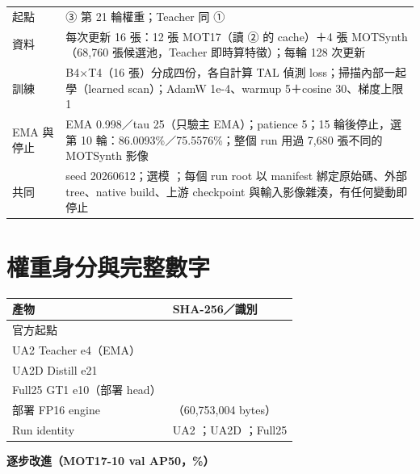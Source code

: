 \documentclass[UTF8,11pt,a4paper,fontset=none]{ctexart}
\newcommand{\code}[1]{\texttt{\detokenize{#1}}}
\begin{document}
\begin{longtable}{@{}P{2.6cm} P{12.2cm}@{}}
起點 & ③ 第 21 輪權重；Teacher 同 ① \\
資料 & 每次更新 16 張：12 張 MOT17（讀 ② 的 cache）＋4 張 MOTSynth（68,760 張候選池，Teacher 即時算特徵）；每輪 128 次更新 \\
訓練 & B4×T4（16 張）分成四份，各自計算 TAL 偵測 loss；掃描內部一起學（learned scan）；AdamW 1e-4、warmup 5＋cosine 30、梯度上限 1 \\
EMA 與停止 & EMA 0.998／tau 25（只驗主 EMA）；patience 5；15 輪後停止，選第 10 輪：86.0093\%／75.5576\%；整個 run 用過 7,680 張不同的 MOTSynth 影像 \\
\midrule
共同 & seed 20260612；選模 \code{t01-selection/1}；每個 run root 以 manifest 綁定原始碼、外部 tree、native build、上游 checkpoint 與輸入影像雜湊，有任何變動即停止 \\
\bottomrule
\end{longtable}
\normalsize

\clearpage
\section{權重身分與完整數字}
\small
\noindent\begin{tabularx}{\textwidth}{@{}P{3.6cm} Y@{}}
\toprule
產物 & SHA-256／識別 \\
\midrule
官方起點 &  \\
UA2 Teacher e4（EMA） &  \\
UA2D Distill e21 &  \\
Full25 GT1 e10（部署 head） &  \\
部署 FP16 engine & （60,753,004 bytes） \\
Run identity & UA2 ；UA2D ；Full25  \\
\bottomrule
\end{tabularx}

\vspace{4mm}
\noindent\textbf{逐步改進（MOT17-10 val AP50，\%）}\par
\noindent
\end{document}
